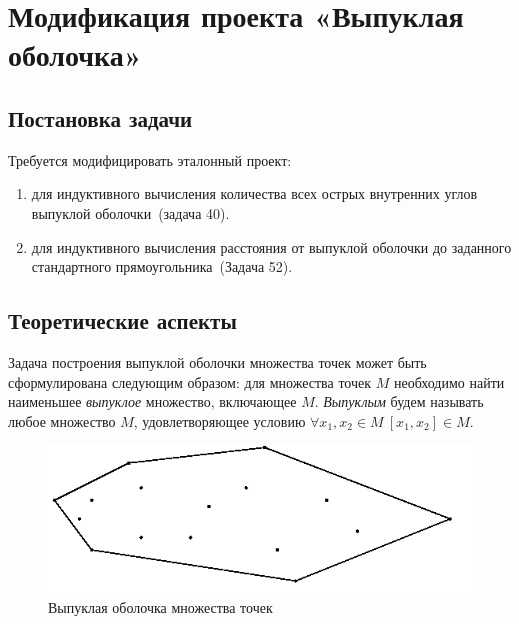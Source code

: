 \section{Модификация проекта «Выпуклая оболочка»}

\subsection{Постановка задачи}
Требуется модифицировать эталонный проект:
\begin{enumerate}
\item для индуктивного вычисления количества всех острых внутренних углов выпуклой оболочки~(задача 40).
\item для индуктивного вычисления расстояния от выпуклой оболочки до заданного стандартного прямоугольника~(Задача 52).
\end{enumerate}
\subsection{Теоретические аспекты}

Задача построения выпуклой оболочки множества точек может быть сформулирована следующим 
образом: для множества точек $M$ необходимо найти наименьшее \emph{выпуклое} множество, 
включающее $M$. \emph{Выпуклым} будем называть любое множество $M$, удовлетворяющее условию
$ \forall x_1, x_2 \in M\ [x_1,x_2]\in M.$

\begin{figure}[ht!]
\begin{center}
\includegraphics[scale=0.6]{images/conv_a_1}
\end{center}
\vspace*{-8mm}
\caption{Выпуклая оболочка множества точек}\label{fig:convex_hull}
\end{figure}

